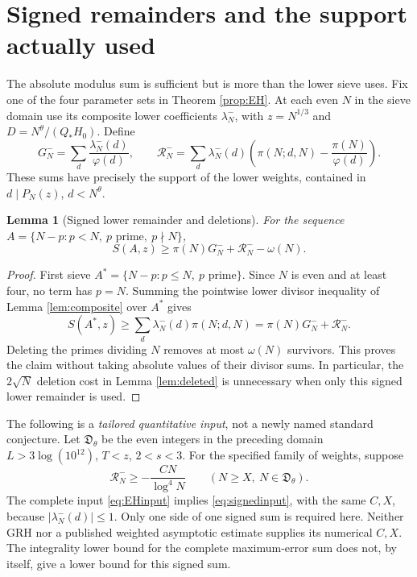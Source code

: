 \documentclass[11pt]{article}
\newtheorem{lemma}[theorem]{Lemma}
\newcommand{\om}{\omega}
\begin{document}
\section{Signed remainders and the support actually used}
The absolute modulus sum is sufficient but is more than the lower sieve
uses. Fix one of the four parameter sets in Theorem \ref{prop:EH}.
At each even $N$ in the sieve domain use its composite lower coefficients $\lambda_N^-$,
with $z=N^{1/3}$ and $D=N^\theta/(Q_*H_0)$. Define
\[
G_N^-=\sum_d\frac{\lambda_N^-(d)}{\varphi(d)},\qquad
\mathcal R_N^-=\sum_d\lambda_N^-(d)
\left(\pi(N;d,N)-\frac{\pi(N)}{\varphi(d)}\right).
\]
These sums have precisely the support of the lower weights,
contained in $d\mid P_N(z)$, $d<N^\theta$.

\begin{lemma}[Signed lower remainder and deletions]\label{lem:signed}
For the sequence $A=\{N-p:p<N,\ p\text{ prime},\ p\nmid N\}$,
\[
S(A,z)\ge\pi(N)G_N^-+\mathcal R_N^- -\om(N).
\]
\end{lemma}
\begin{proof}
First sieve $A^*=\{N-p:p\le N,\ p\text{ prime}\}$.
Since $N$ is even and at least four, no term has $p=N$.
Summing the pointwise lower divisor inequality of Lemma
\ref{lem:composite} over $A^*$ gives
\[
S(A^*,z)\ge\sum_d\lambda_N^-(d)\pi(N;d,N)
=\pi(N)G_N^-+\mathcal R_N^-.
\]
Deleting the primes dividing $N$ removes at most $\om(N)$ survivors.
This proves the claim without taking absolute values of their divisor sums.
In particular, the $2\sqrt N$ deletion cost in Lemma \ref{lem:deleted}
is unnecessary when only this signed lower remainder is used.
\end{proof}

The following is a \emph{tailored quantitative input}, not a newly named
standard conjecture. Let $\mathfrak D_\theta$ be the even integers in
the preceding domain $L>3\log(10^{12})$, $T<z$, $2<s<3$.
For the specified family of weights, suppose
\begin{equation}\label{eq:signedinput}
\mathcal R_N^-\ge-\frac{CN}{\log^4N}
\qquad(N\ge X,\ N\in\mathfrak D_\theta).
\end{equation}
The complete input \eqref{eq:EHinput} implies \eqref{eq:signedinput},
with the same $C,X$, because $|\lambda_N^-(d)|\le1$.
Only one side of one signed sum is required here. Neither GRH nor a
published weighted asymptotic estimate supplies its numerical $C,X$.
The integrality lower bound for the complete maximum-error sum does not,
by itself, give a lower bound for this signed sum.
\end{document}
